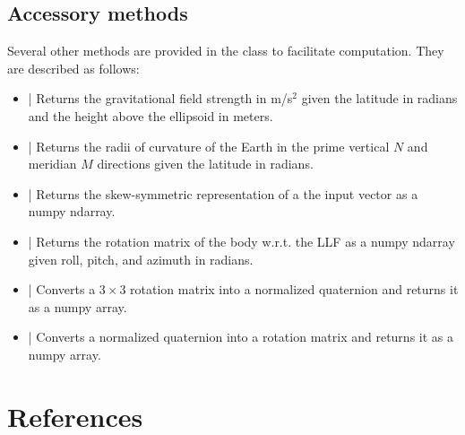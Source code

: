 \documentclass[11pt, oneside]{article}   	%
\begin{document}
\subsection{Accessory methods}
Several other methods are provided in the  class to facilitate computation.  They are described as follows:
\begin{itemize}
	\item {} | Returns the gravitational field strength in m/s$^2$ given the latitude in radians and the height above the ellipsoid in meters.
	\item {} | Returns the radii of curvature of the Earth in the prime vertical $N$ and meridian $M$ directions given the latitude in radians.
	\item {} | Returns the skew-symmetric representation of a the input vector as a numpy ndarray.
	\item {} | Returns the rotation matrix of the body w.r.t. the LLF as a numpy ndarray given roll, pitch, and azimuth in radians.
	\item {} | Converts a $3\times3$ rotation matrix into a normalized quaternion and returns it as a numpy array.
	\item {} | Converts a normalized quaternion into a rotation matrix and returns it as a numpy array.
\end{itemize}



\section{References}

\begin{small}



\end{small}
\end{document}
